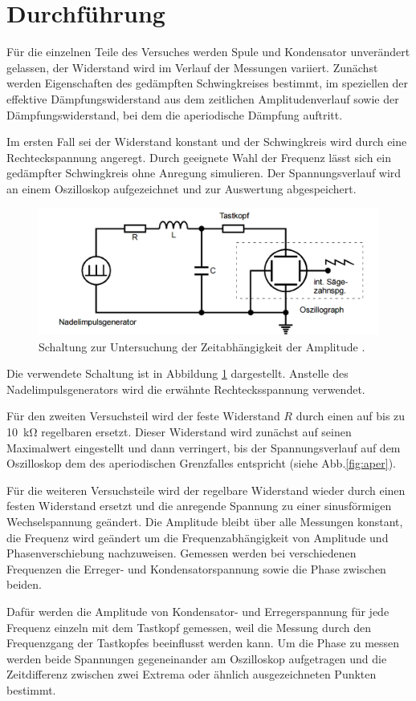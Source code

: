 \section{Durchführung}
\label{sec:Durchführung}
Für die einzelnen Teile des Versuches werden
Spule und Kondensator unverändert gelassen, der Widerstand wird im Verlauf
der Messungen variiert.
Zunächst werden Eigenschaften des gedämpften Schwingkreises bestimmt,
im speziellen der effektive
Dämpfungswiderstand aus dem zeitlichen Amplitudenverlauf
sowie der Dämpfungswiderstand, bei dem die aperiodische
Dämpfung auftritt.

Im ersten Fall sei der Widerstand konstant und der Schwingkreis wird durch eine
Rechteckspannung angeregt. Durch geeignete Wahl der Frequenz lässt sich ein
gedämpfter Schwingkreis ohne Anregung simulieren. Der Spannungsverlauf wird
an einem Oszilloskop aufgezeichnet und zur Auswertung abgespeichert.
\begin{figure}
  \centering
  \includegraphics[keepaspectratio, width=\textwidth]{5a.png}
  \caption{Schaltung zur Untersuchung der Zeitabhängigkeit
  der Amplitude \cite{officialmanual}.}
  \label{fig:5a}
\end{figure}
Die verwendete Schaltung ist in Abbildung \ref{fig:5a} dargestellt. Anstelle des
Nadelimpulsgenerators wird die erwähnte Rechtecksspannung verwendet.

Für den zweiten Versuchsteil wird der feste Widerstand $R$ durch einen auf bis zu
\SI{10}{\kilo\ohm} regelbaren ersetzt. Dieser Widerstand wird zunächst auf seinen
Maximalwert eingestellt und dann verringert, bis der Spannungsverlauf
auf dem Oszilloskop dem des aperiodischen Grenzfalles entspricht
(siehe Abb.\ref{fig:aper}).

Für die weiteren Versuchsteile wird der regelbare Widerstand wieder durch einen
festen Widerstand ersetzt und die anregende Spannung zu einer sinusförmigen
Wechselspannung geändert. Die Amplitude bleibt über alle Messungen konstant,
die Frequenz wird geändert um die Frequenzabhängigkeit von Amplitude und
Phasenverschiebung nachzuweisen.
Gemessen werden bei verschiedenen Frequenzen die Erreger- und
Kondensatorspannung sowie die Phase zwischen beiden.

Dafür werden die Amplitude von Kondensator- und Erregerspannung für jede
Frequenz einzeln mit dem Tastkopf gemessen,
weil die Messung durch den Frequenzgang der Tastkopfes beeinflusst werden kann.
Um die Phase zu messen werden beide Spannungen gegeneinander am Oszilloskop
aufgetragen und die Zeitdifferenz zwischen zwei Extrema
oder ähnlich ausgezeichneten Punkten bestimmt.
